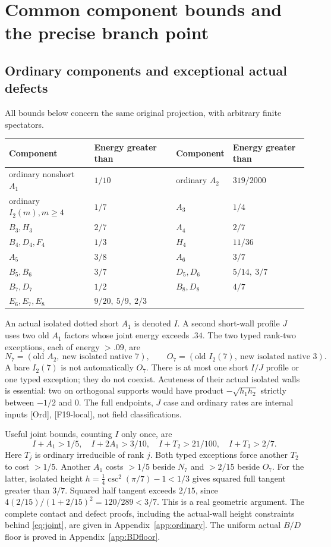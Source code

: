 \documentclass[11pt]{article}
\theoremstyle{definition}
\theoremstyle{remark}
\newcommand{\src}[1]{\textnormal{\textsf{[#1]}}}
\begin{document}
\section{Common component bounds and the precise branch point}
\label{sec:components}
\subsection{Ordinary components and exceptional actual defects}
All bounds below concern the same original projection, with
arbitrary finite spectators.
\begin{center}\small
\begin{tabular}{ll@{\qquad}ll}
\toprule
Component&Energy greater than&Component&Energy greater than\\ \midrule
ordinary nonshort \(A_1\)&\(1/10\)&ordinary \(A_2\)&\(319/2000\)\\
ordinary \(I_2(m),m\geq4\)&\(1/7\)&\(A_3\)&\(1/4\)\\
\(B_3,H_3\)&\(2/7\)&\(A_4\)&\(2/7\)\\
\(B_4,D_4,F_4\)&\(1/3\)&\(H_4\)&\(11/36\)\\
\(A_5\)&\(3/8\)&\(A_6\)&\(3/7\)\\
\(B_5,B_6\)&\(3/7\)&\(D_5,D_6\)&\(5/14,\ 3/7\)\\
\(B_7,D_7\)&\(1/2\)&\(B_8,D_8\)&\(4/7\)\\
\(E_6,E_7,E_8\)&\(9/20,\ 5/9,\ 2/3\)&&\\ \bottomrule
\end{tabular}
\end{center}
An actual isolated dotted short \(A_1\) is denoted \(I\).
A second short-wall profile \(J\) uses two old \(A_1\) factors
whose joint energy exceeds \(.34\).
The two typed rank-two exceptions, each of energy \(>.09\), are
\[
 N_7=(\text{old }A_2,\ \text{new isolated native }7),\qquad
 O_7=(\text{old }I_2(7),\ \text{new isolated native }3).
\]
A bare \(I_2(7)\) is not automatically \(O_7\).
There is at most one short \(I/J\) profile or one typed exception;
they do not coexist. Acuteness of their actual isolated walls
is essential: two on orthogonal supports would have product
\(-\sqrt{h_1h_2}\) strictly between \(-1/2\) and \(0\).
The full endpoints, \(J\) case and ordinary rates are internal
inputs \src{Ord}, \src{F19-local}, not field classifications.

Useful joint bounds, counting \(I\) only once, are
\begin{equation}
\label{eq:joint}
 I+A_1>1/5,\quad I+2A_1>3/10,\quad
 I+T_2>21/100,\quad I+T_3>2/7.
\end{equation}
Here \(T_j\) is ordinary irreducible of rank \(j\).
Both typed exceptions force another \(T_2\) to cost \(>1/5\).
Another \(A_1\) costs \(>1/5\) beside \(N_7\) and \(>2/15\)
beside \(O_7\). For the latter, isolated height
\(h=\tfrac14\csc^2(\pi/7)-1<1/3\) gives squared full tangent
greater than \(3/7\). Squared half tangent exceeds \(2/15\),
since \(4(2/15)/(1+2/15)^2=120/289<3/7\).
This is a real geometric argument.
The complete contact and defect proofs, including the actual-wall
height constraints behind \eqref{eq:joint}, are given in
Appendix~\ref{app:ordinary}. The uniform actual \(B/D\) floor
is proved in Appendix~\ref{app:BDfloor}.
\end{document}
